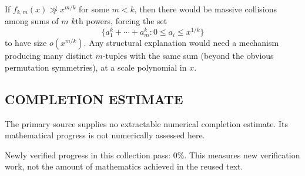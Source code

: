 If $f_{k,m}(x)\not\gg x^{m/k}$ for some $m<k$, then there would be massive collisions among sums of $m$ $k$th powers, forcing the set
\[\{a_1^k+\cdots+a_m^k: 0\le a_i\le x^{1/k}\}\]
to have size $o(x^{m/k})$. Any structural explanation would need a mechanism producing many distinct $m$-tuples with the same sum (beyond the obvious permutation symmetries), at a scale polynomial in $x$.




\subsection*{COMPLETION ESTIMATE}
The primary source supplies no extractable numerical completion estimate. Its mathematical progress is not numerically assessed here.

Newly verified progress in this collection pass: $0\%$. This measures new verification work, not the amount of mathematics achieved in the reused text.
